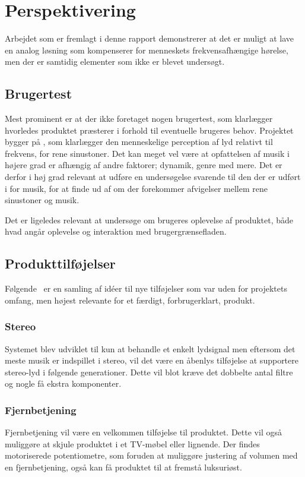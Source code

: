 \chapter{Perspektivering}
\label{Perspektivering}
%
Arbejdet som er fremlagt i denne rapport demonstrerer at det er muligt at lave en analog løsning som kompenserer for menneskets frekvensafhængige hørelse, men der er samtidig elementer som ikke er blevet undersøgt.
%
\section{Brugertest}
\label{Perspektivering_Brugertest}
Mest prominent er at der ikke foretaget nogen brugertest, som klarlægger hvorledes produktet præsterer i forhold til eventuelle brugeres behov. Projektet bygger på \textcite{STD:ISO226}, som klarlægger den menneskelige perception af lyd relativt til frekvens, for rene sinustoner. Det kan meget vel være at opfattelsen af musik i højere grad er afhængig af andre faktorer; dynamik, genre med mere. Det er derfor i høj grad relevant at udføre en undersøgelse svarende til den der er udført i \textcite{STD:ISO226} for musik, for at finde ud af om der forekommer afvigelser mellem rene sinustoner og musik. 

Det er ligeledes relevant at undersøge om brugeres oplevelse af produktet, både hvad angår oplevelse og interaktion med brugergrænsefladen. 
%
\section{Produkttilføjelser}
\label{Perspektivering_Tilfoejelser}
%
Følgende \subsectionnamecustom\ er en samling af idéer til nye tilføjelser som var uden for projektets omfang, men højest relevante for et færdigt, forbrugerklart, produkt.
%
\subsection{Stereo}
Systemet blev udviklet til kun at behandle et enkelt lydsignal men eftersom det meste musik er indspillet i stereo, vil det være en åbenlys tilføjelse at supportere stereo-lyd i følgende generationer. Dette vil blot kræve det dobbelte antal filtre og nogle få ekstra komponenter.
%
\subsection{Fjernbetjening}
Fjernbetjening vil være en velkommen tilføjelse til produktet. Dette vil også muliggøre at skjule produktet i et TV-møbel eller lignende. Der findes motoriserede potentiometre, som foruden at muliggøre justering af volumen med en fjernbetjening, også kan få produktet til at fremstå luksuriøst.
%
